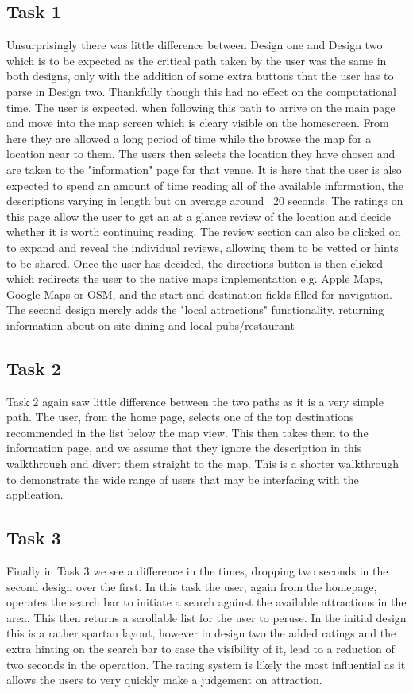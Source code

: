\documentclass{article}
\begin{document}
\subsection{Task 1}
Unsurprisingly there was little difference between Design one and Design two which is to be expected as the critical path taken by the user was the same in both designs, only with the addition of some extra buttons that the user has to parse in Design two.
Thankfully though this had no effect on the computational time.
The user is expected, when following this path to arrive on the main page and move into the map screen which is cleary visible on the homescreen.
From here they are allowed a long period of time while the browse the map for a location near to them.
The users then selects the location they have chosen and are taken to the "information" page for that venue.
It is here that the user is also expected to spend an amount of time reading all of the available information, the descriptions varying in length but on average around ~20 seconds.
The ratings on this page allow the user to get an at a glance review of the location and decide whether it is worth continuing reading.
The review section can also be clicked on to expand and reveal the individual reviews, allowing them to be vetted or hints to be shared.
Once the user has decided, the directions button is then clicked which redirects the user to the native maps implementation e.g. Apple Maps, Google Maps or OSM, and the start and destination fields filled for navigation.
The second design merely adds the "local attractions" functionality, returning information about on-site dining and local pubs/restaurant
\subsection{Task 2}
Task 2 again saw little difference between the two paths as it is a very simple path.
The user, from the home page, selects one of the top destinations recommended in the list below the map view.
This then takes them to the information page, and we assume that they ignore the description in this walkthrough and divert them straight to the map.
This is a shorter walkthrough to demonstrate the wide range of users that may be interfacing with the application.
\subsection{Task 3}
Finally in Task 3 we see a difference in the times, dropping two seconds in the second design over the first.
In this task the user, again from the homepage, operates the search bar to initiate a search against the available attractions in the area.
This then returns a scrollable list for the user to peruse.
In the initial design this is a rather spartan layout, however in design two the added ratings and the extra hinting on the search bar to ease the visibility of it, lead to a reduction of two seconds in the operation.
The rating system is likely the most influential as it allows the users to very quickly make a judgement on attraction.
\end{document}
